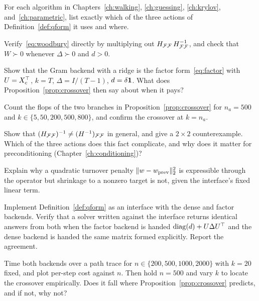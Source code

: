 \begin{exercises}

\begin{exercise}
For each algorithm in Chapters~\ref{ch:walking}, \ref{ch:guessing}, \ref{ch:krylov},
and~\ref{ch:parametric}, list exactly which of the three actions of
Definition~\ref{def:qform} it uses and where.
\end{exercise}

\begin{exercise}
Verify~\eqref{eq:woodbury} directly by multiplying out
$H_{\mathcal{F}\mathcal{F}}\,H_{\mathcal{F}\mathcal{F}}^{-1}$, and check that $W \succ 0$ whenever
$\Delta \succ 0$ and $d > 0$.
\end{exercise}

\begin{exercise}
Show that the Gram backend with a ridge is the factor form~\eqref{eq:factor} with
$U = X_c^{\top}$, $k = T$, $\Delta = I/(T-1)$, $d = \delta\mathbf{1}$. What does
Proposition~\ref{prop:crossover} then say about when it pays?
\end{exercise}

\begin{exercise}
Count the flops of the two branches in Proposition~\ref{prop:crossover} for
$n_a = 500$ and $k \in \{5, 50, 200, 500, 800\}$, and confirm the crossover at $k = n_a$.
\end{exercise}

\begin{exercise}
Show that $(H_{\mathcal{F}\mathcal{F}})^{-1} \ne (H^{-1})_{\mathcal{F}\mathcal{F}}$ in general, and give a
$2\times2$ counterexample. Which of the three actions does this fact complicate, and
why does it matter for preconditioning (Chapter~\ref{ch:conditioning})?
\end{exercise}

\begin{exercise}
Explain why a quadratic turnover penalty $\lVert w - w_{\mathrm{prev}} \rVert_2^2$ is
expressible through the operator but shrinkage to a nonzero target is not, given the
interface's fixed linear term.
\end{exercise}

\begin{exercise}[Implementation]
Implement Definition~\ref{def:qform} as an interface with the dense and factor
backends. Verify that a solver written against the interface returns identical answers
from both when the factor backend is handed $\operatorname{diag}(d) + U\Delta U^{\top}$ and the dense
backend is handed the same matrix formed explicitly. Report the agreement.
\end{exercise}

\begin{exercise}[Implementation]
Time both backends over a path trace for $n \in \{200, 500, 1000, 2000\}$ with $k = 20$
fixed, and plot per-step cost against $n$. Then hold $n = 500$ and vary $k$ to locate
the crossover empirically. Does it fall where Proposition~\ref{prop:crossover} predicts,
and if not, why not?
\end{exercise}

\end{exercises}
